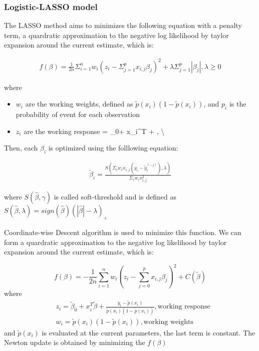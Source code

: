 \documentclass[]{article}
\providecommand{\tightlist}{%
  \setlength{\itemsep}{0pt}\setlength{\parskip}{0pt}}
\begin{document}
\hypertarget{logistic-lasso-model}{%
\subsubsection{Logistic-LASSO model}\label{logistic-lasso-model}}

The LASSO method aims to minimizes the following equation with a penalty
term, a quardratic approximation to the negative log likelihood by
taylor expansion around the current estimate, which is:

\[
\begin{aligned}
f(\beta) = \frac{1}{2n}\Sigma^n_{i=1}w_{i}(z_{i}-\Sigma^p_{j=1}x_{i,j}\beta_{j})^2 + \lambda \Sigma^p_{j=1}|\beta_{j}|, \lambda \geq 0
\end{aligned}
\]

where

\begin{itemize}
\tightlist
\item
  \(w_{i}\) are the working weights, defined as
  \(\tilde{p}(x_i)(1-\tilde{p}(x_i))\), and \(p_{i}\) is the probability
  of event for each observation
\item
  \(z_i\) are the working response = \tilde{\beta}\_0+
  x\_i\^{}T\tilde{\beta} +
  ,
  \textbackslash{}
\end{itemize}

Then, each \(\beta_{i}\) is optimized using the folllowing equation:

\[
\begin{aligned}
\tilde\beta_{i} = \frac{S(\Sigma_{i}w_{i}x_{i,j}(y_{i}-\tilde{y}^{(-j)}_{i}),\lambda)}{\Sigma_{i}w_{i}x_{i,j}^2}
\end{aligned}
\]

where \(S(\hat\beta, \gamma)\) is called soft-threshold and is defined
as
\(S(\hat{\beta}, \lambda) = sign(\hat{\beta})(|\hat{\beta}| - \lambda)_{+}\)

Coordinate-wise Descent algorithm is used to minimize this function. We
can form a quardratic approximation to the negative log likelihood by
taylor expansion around the current estimate, which is:

\[
f(\beta) = -\frac{1}{2n}\sum_{i=1}^{n}w_i(z_{i} - \sum_{j=0}^{p}x_{i,j}\beta_{j})^{2} + C(\tilde{\beta})
\] where \[
\begin{aligned}
& z_i = \tilde{\beta}_0+ x_i^T\tilde{\beta} + \frac{y_i-\tilde{p}(x_i)}{\tilde{p}(x_i)(1-\tilde{p}(x_i))}, \text{working response}\\
& w_i = \tilde{p}(x_i)(1-\tilde{p}(x_i)), \text{working weights}
\end{aligned}
\] and \(\tilde{p}(x_i)\) is evaluated at the current parameters, the
last term is constant. The Newton update is obtained by minimizing the
\(f(\beta)\)
\end{document}
